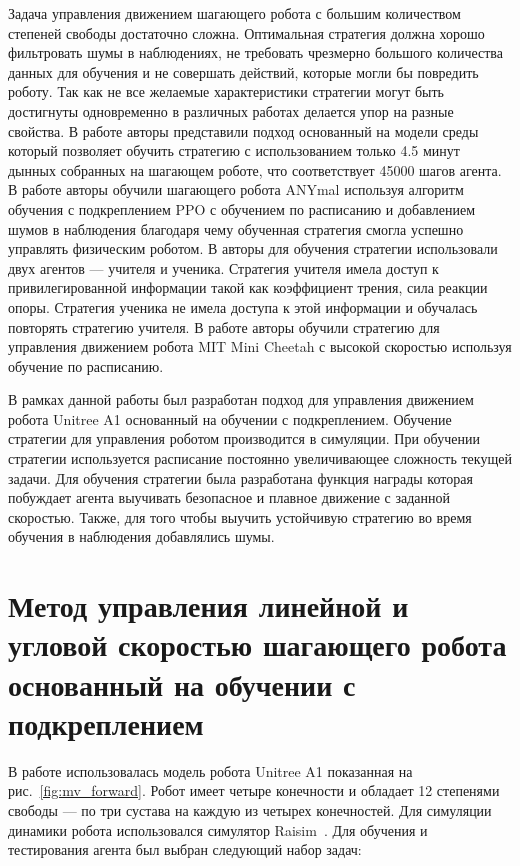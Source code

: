 Задача управления движением шагающего робота с большим количеством степеней свободы достаточно сложна. Оптимальная стратегия должна хорошо фильтровать шумы в наблюдениях, не требовать чрезмерно большого количества данных для обучения и 
не совершать действий, которые могли бы повредить роботу. Так как не все желаемые характеристики стратегии могут быть достигнуты одновременно в различных работах делается упор на разные свойства. В работе \cite{yang2020data} авторы представили подход основанный на модели среды который позволяет обучить стратегию с использованием только 4.5 минут дынных собранных на шагающем роботе, что соответствует 45000 шагов агента. В работе \cite{Hwangbo2019} авторы обучили шагающего робота ANYmal \cite{anymal} используя алгоритм обучения с подкреплением PPO \cite{Schulman2017ProximalPO} с обучением по расписанию и добавлением шумов в наблюдения благодаря чему обученная стратегия смогла успешно управлять физическим роботом. В  \cite{chalter} авторы для обучения стратегии использовали двух агентов --- учителя и ученика. Стратегия учителя имела доступ к привилегированной информации такой как коэффициент трения, сила реакции опоры.  Стратегия ученика не имела доступа к этой информации и обучалась повторять стратегию учителя. В работе \cite{rapid} авторы обучили стратегию для управления движением робота MIT Mini Cheetah с высокой скоростью используя обучение по расписанию.

В рамках данной работы был разработан подход для управления движением робота Unitree A1 \cite{unitree} основанный на обучении с подкреплением. Обучение стратегии для управления роботом производится в симуляции. При обучении стратегии используется расписание постоянно увеличивающее сложность текущей задачи. Для обучения стратегии была разработана функция награды которая побуждает агента выучивать безопасное и плавное движение с заданной скоростью. Также, для того чтобы выучить устойчивую стратегию во время обучения в наблюдения добавлялись шумы. 

\section{Метод управления линейной и угловой скоростью шагающего робота основанный на обучении с подкреплением}

В работе использовалась модель робота Unitree A1 показанная на рис.~\ref{fig:mv_forward}. Робот имеет четыре конечности и обладает 12 степенями свободы ---  по три сустава на каждую из четырех конечностей. Для симуляции динамики робота использовался симулятор Raisim~\cite{raisim}. Для обучения и тестирования агента был выбран следующий набор задач: 

